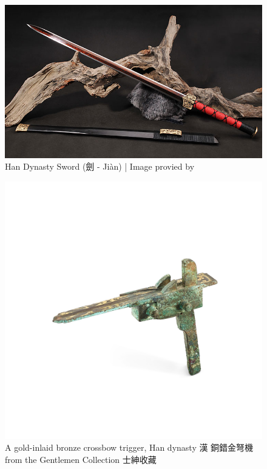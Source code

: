 \documentclass{ctexart}
\begin{document}
\begin{figure}
    \centering
    \includegraphics[scale=0.6]{2.jpg}
    \caption{Han Dynasty Sword (劍 - Jiàn) | Image provied by \cite{internalwudangstore_2024_the} }
    \label{fig:enter-label}
\end{figure}

\begin{figure}
    \centering
    \includegraphics[scale=0.5]{3.jpg}
    \caption{A gold-inlaid bronze crossbow trigger, Han dynasty 漢 銅錯金弩機 from the Gentlemen Collection 士紳收藏}
    \label{fig:enter-label}
\end{figure}
\newpage
\end{document}
